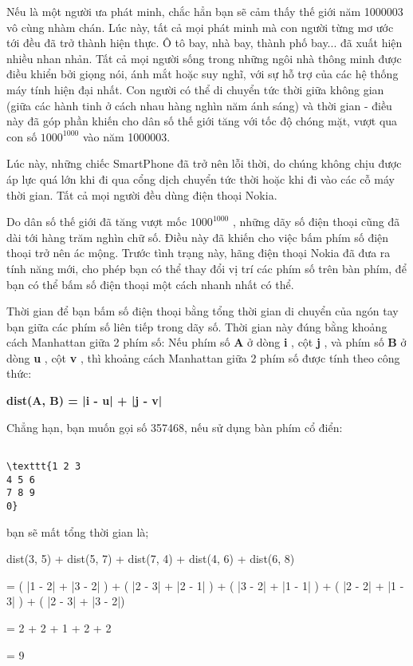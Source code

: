 Nếu là một người ưa phát minh, chắc hẳn bạn sẽ cảm thấy thế giới năm 1000003 vô cùng nhàm chán. Lúc này, tất cả mọi phát minh mà con người từng mơ ước tới đều đã trở thành hiện thực. Ô tô bay, nhà bay, thành phố bay... đã xuất hiện nhiều nhan nhản. Tất cả mọi người sống trong những ngôi nhà thông minh được điều khiển bởi giọng nói, ánh mắt hoặc suy nghĩ, với sự hỗ trợ của các hệ thống máy tính hiện đại nhất. Con người có thể di chuyển tức thời giữa không gian (giữa các hành tinh ở cách nhau hàng nghìn năm ánh sáng) và thời gian - điều này đã góp phần khiến cho dân số thế giới tăng với tốc độ chóng mặt, vượt qua con số $1000^{1000}$ vào năm 1000003.

Lúc này, những chiếc SmartPhone đã trở nên lỗi thời, do chúng không chịu được áp lực quá lớn khi đi qua cổng dịch chuyển tức thời hoặc khi đi vào các cỗ máy thời gian. Tất cả mọi người đều dùng điện thoại Nokia.

Do dân số thế giới đã tăng vượt mốc $1000^{1000}$ , những dãy số điện thoại cũng đã dài tới hàng trăm nghìn chữ số. Điều này đã khiến cho việc bấm phím số điện thoại trở nên ác mộng. Trước tình trạng này, hãng điện thoại Nokia đã đưa ra tính năng mới, cho phép bạn có thể thay đổi vị trí các phím số trên bàn phím, để bạn có thể bấm số điện thoại một cách nhanh nhất có thể.

Thời gian để bạn bấm số điện thoại bằng tổng thời gian di chuyển của ngón tay bạn giữa các phím số liên tiếp trong dãy số. Thời gian này đúng bằng khoảng cách Manhattan giữa 2 phím số: Nếu phím số \textbf{ A } ở dòng \textbf{ i } , cột \textbf{ j } , và phím số \textbf{ B } ở dòng \textbf{ u } , cột \textbf{ v } , thì khoảng cách Manhattan giữa 2 phím số được tính theo công thức:

\textbf{dist(A, B) = |i - u| + |j - v| }

Chẳng hạn, bạn muốn gọi số 357468, nếu sử dụng bàn phím cổ điển:
\begin{verbatim}

\texttt{1 2 3
4 5 6
7 8 9
0}\end{verbatim}

bạn sẽ mất tổng thời gian là;

dist(3, 5) + dist(5, 7) + dist(7, 4) + dist(4, 6) + dist(6, 8)

= ( |1 - 2| + |3 - 2| ) + ( |2 - 3| + |2 - 1| ) + ( |3 - 2| + |1 - 1| ) + ( |2 - 2| + |1 - 3| ) + ( |2 - 3| + |3 - 2|)

= 2 + 2 + 1 + 2 + 2

= 9

